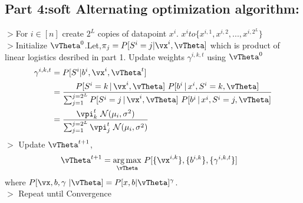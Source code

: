 \documentclass[a4paper,11pt]{article}
\begin{document}
\begin{mlsolution}
	\subsection{Part 4:\textbf{soft Alternating optimization algorithm:}}
		$>$For $i \in [n]$ create $2^L$ copies of datapoint $x^i$.
				$x^i to \{x^{i,1}, x^{i,2},..., x^{i,2^L}\}$\\
		$>$Initialize $\vTheta^0$.Let,$\mathcal{\pi}_j = P[S^i = j | \vx^i, \vTheta]$ which is product of linear logistics desribed in part 1.
		Update weights $\gamma^{i,k,t}$ using $\vTheta^0$
				\begin{align*}
					\gamma^{i,k,t} &= P[S^i | b^i, \vx^i, \vTheta^t]\\
					&= \frac{P[S^i = k \cond \vx^i, \vTheta]\ P[b^i\cond x^i, S^i = k, \vTheta]}
					{\sum_{j=1}^{j=2^L}P[S^i = j\cond \vx^i, \vTheta]\ P[b^i\cond x^i, S^i = j, \vTheta]}\\
					&= \frac{\mathcal{\vpi}_k^t\ \mathcal{N}(\mu_i, \sigma^2)}
					{\sum_{j=1}^{j=2^L}\mathcal{\vpi}_j^t\ \mathcal{N}(\mu_i, \sigma^2)}
				\end{align*}
		$>$ Update $\vTheta^{t+1}$,
		\begin{align*}
			\vTheta^{t+1} &= \underset{\vTheta}{\arg\max}\ P[\{\vx^{i,k}\}, \{b^{i,k}\}, \{\gamma^{i,k,t}\}]
		\end{align*}
		where $P[\vx,b,\gamma\ |\vTheta] = P[x,b|\vTheta]^\gamma$.\\
		$>$ Repeat until Convergence	
	
\end{mlsolution}
\end{document}
